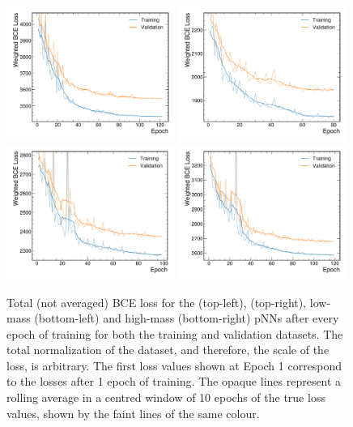 \begin{figure}
    \centering
    \includegraphics[width=0.49\textwidth]{Figures/Dihiggs/categorisation/radion_loss.pdf}
    \includegraphics[width=0.49\textwidth]{Figures/Dihiggs/categorisation/y_tautau_loss.pdf} \\
    \includegraphics[width=0.49\textwidth]{Figures/Dihiggs/categorisation/y_gg_low_mass_loss.pdf}
    \includegraphics[width=0.49\textwidth]{Figures/Dihiggs/categorisation/y_gg_high_mass_loss.pdf}
    \caption[Evolution of BCE Loss for the \XZeroHH, and \XYH pNNs]{Total (not averaged) BCE loss for the \XZeroHH (top-left), \XYttHgg (top-right), low-mass \XYggHtt (bottom-left) and high-mass \XYggHtt (bottom-right) pNNs after every epoch of training for both the training and validation datasets. The total normalization of the dataset, and therefore, the scale of the loss, is arbitrary. The first loss values shown at Epoch 1 correspond to the losses after 1 epoch of training. The opaque lines represent a rolling average in a centred window of 10 epochs of the true loss values, shown by the faint lines of the same colour.}\label{fig:pNN_loss_rest}
\end{figure}

